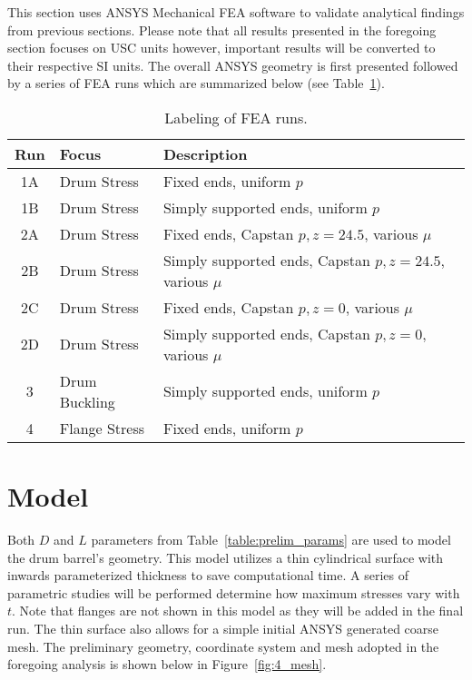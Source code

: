 This section uses ANSYS Mechanical FEA software \cite{ANSYS} to validate analytical findings from previous sections. Please note that all results presented in the foregoing section focuses on USC units however, important results will be converted to their respective SI units. The overall ANSYS geometry is first presented followed by a series of FEA runs which are summarized below (see Table~\ref{table:4_runs}).

\begin{table}[H]
  \centering
  \caption{Labeling of FEA runs.}
    \begin{tabular}{cll}
    \textbf{Run} & \textbf{Focus} & \textbf{Description}\\
    \hline
    1A    & Drum Stress & Fixed ends, uniform $p$\\
    1B    & Drum Stress & Simply supported ends, uniform $p$ \\
    2A    & Drum Stress & Fixed ends, Capstan $p, z=24.5$, various $\mu$ \\
    2B    & Drum Stress & Simply supported ends, Capstan $p, z=24.5$, various $\mu$ \\
    2C    & Drum Stress & Fixed ends, Capstan $p, z=0$, various $\mu$ \\
    2D    & Drum Stress & Simply supported ends, Capstan $p, z=0$, various $\mu$ \\
    3     & Drum Buckling & Simply supported ends, uniform $p$ \\
    4     & Flange Stress & Fixed ends, uniform $p$ \\
    \end{tabular}%
  \label{table:4_runs}%
\end{table}%


\section{Model}

Both $D$ and $L$ parameters from Table~\ref{table:prelim_params} are used to model the drum barrel's geometry. This model utilizes a thin cylindrical surface with inwards parameterized thickness to save computational time. A series of parametric studies will be performed determine how maximum stresses vary with $t$. Note that flanges are not shown in this model as they will be added in the final run. The thin surface also allows for a simple initial ANSYS generated coarse mesh. The preliminary geometry, coordinate system and mesh adopted in the foregoing analysis is shown below in Figure~\ref{fig:4_mesh}.

